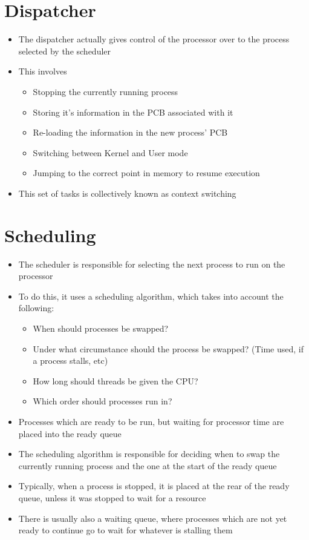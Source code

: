 \section*{Dispatcher}

\begin{itemize}
  \item The dispatcher actually gives control of the processor over to the process selected by the scheduler
  \item This involves
  \begin{itemize}
    \item Stopping the currently running process
    \item Storing it's information in the PCB associated with it
    \item Re-loading the information in the new process' PCB
    \item Switching between Kernel and User mode
    \item Jumping to the correct point in memory to resume execution
  \end{itemize}
  \item This set of tasks is collectively known as context switching
\end{itemize}

\section*{Scheduling}

\begin{itemize}
  \item The scheduler is responsible for selecting the next process to run on the processor
  \item To do this, it uses a scheduling algorithm, which takes into account the following:
  \begin{itemize}
    \item When should processes be swapped?
    \item Under what circumstance should the process be swapped? (Time used, if a process stalls, etc)
    \item How long should threads be given the CPU?
    \item Which order should processes run in?
  \end{itemize}
  \item Processes which are ready to be run, but waiting for processor time are placed into the ready queue
  \item The scheduling algorithm is responsible for deciding when to swap the currently running process and the one at the start of the ready queue
  \item Typically, when a process is stopped, it is placed at the rear of the ready queue, unless it was stopped to wait for a resource
  \item There is usually also a waiting queue, where processes which are not yet ready to continue go to wait for whatever is stalling them
\end{itemize}

